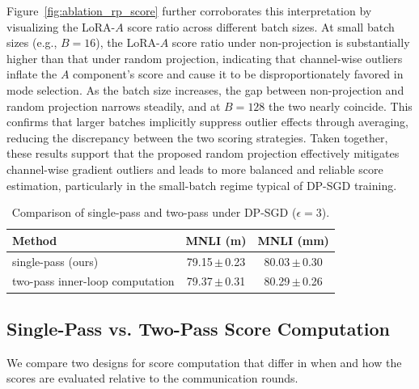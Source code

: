 Figure~\ref{fig:ablation_rp_score} further corroborates this interpretation by 
visualizing the LoRA-$A$ score ratio across different batch sizes.
At small batch sizes (e.g., $B{=}16$), the LoRA-$A$ score ratio under 
non-projection is substantially higher than that under random projection, 
indicating that channel-wise outliers inflate the $A$ component's score and 
cause it to be disproportionately favored in mode selection.
As the batch size increases, the gap between non-projection and random projection 
narrows steadily, and at $B{=}128$ the two nearly coincide.
This confirms that larger batches implicitly suppress outlier effects through 
averaging, reducing the discrepancy between the two scoring strategies.
Taken together, these results support that the proposed random projection 
effectively mitigates channel-wise gradient outliers and leads to more balanced 
and reliable score estimation, particularly in the small-batch regime typical of 
DP-SGD training.



\begin{table}
\vspace{-13pt}
\centering
\scriptsize
\setlength{\tabcolsep}{2pt}
\renewcommand{\arraystretch}{1.05}
\newcommand{\std}[1]{\,{\tiny$\pm$}\,\tiny #1}

\caption{Comparison of single-pass and two-pass under DP-SGD ($\epsilon=3$).}
\label{tab:pass}

\begin{tabular}{lcc}
\toprule
\textbf{Method} & \textbf{MNLI (m)} & \textbf{MNLI (mm)} \\
\midrule
single-pass (ours)
& 79.15\std{0.23}
& 80.03\std{0.30} \\

two-pass inner-loop computation
& 79.37\std{0.31}
& 80.29\std{0.26} \\
\bottomrule
\end{tabular}

\vspace{-8pt}
\end{table}

\subsection{Single-Pass vs. Two-Pass Score Computation}
\label{app:pass}

We compare two designs for score computation that differ in when and how the 
scores are evaluated relative to the communication rounds.

